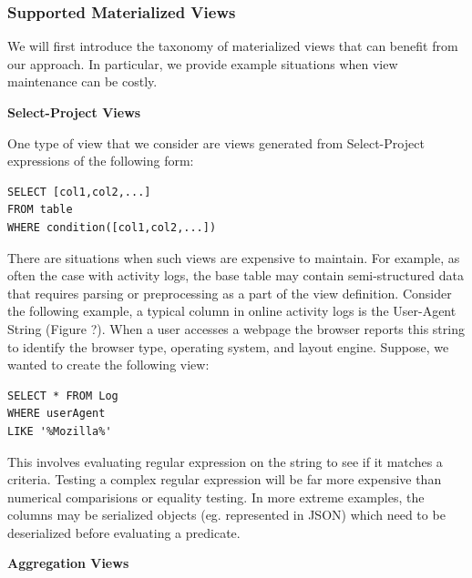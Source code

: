 \subsubsection{Supported Materialized Views}\label{subsubsec:supported-view}
We will first introduce the taxonomy of materialized views
that can benefit from our approach. In particular, we provide example
situations when view maintenance can be costly. 

\vspace{1em}

\noindent\textbf{Select-Project Views}

One type of view that we consider are views generated from Select-Project
expressions of the following form:

\begin{lstlisting}
SELECT [col1,col2,...] 
FROM table 
WHERE condition([col1,col2,...]) 
\end{lstlisting}

There are situations when such views are expensive to maintain. For
example, as often the case with activity logs, the base table may
contain semi-structured data that requires parsing or preprocessing
as a part of the view definition. Consider the following example,
a typical column in online activity logs is the User-Agent String
(Figure ?). When a user accesses a webpage the browser reports this
string to identify the browser type, operating system, and layout
engine. Suppose, we wanted to create the following view:

\begin{lstlisting}
SELECT * FROM Log 
WHERE userAgent 
LIKE '%Mozilla%'
\end{lstlisting}

This involves evaluating regular expression on the string to see if
it matches a criteria.
Testing a complex regular expression will be far more expensive than
numerical comparisions or equality testing. In more extreme examples,
the columns may be serialized objects (eg. represented in JSON) which
need to be deserialized before evaluating a predicate.



\vspace{1em}

\noindent\textbf{Aggregation Views}

